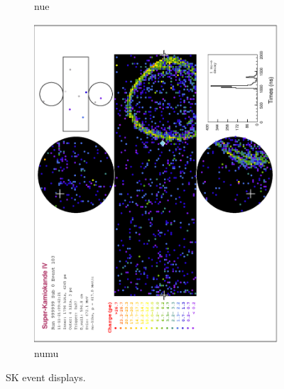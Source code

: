 \begin{figure}
\begin{subfigure}[b]{\dbfigwid\textwidth}
             \caption{nue}
             \label{subfig:sk-nue}
        \end{subfigure}
        \begin{subfigure}[b]{\dbfigwid\textwidth}
             \centering
             \includegraphics[width=\textwidth]{figures/t2k/sk-numu.eps}
             \caption{numu}
             \label{subfig:sk-numu}
        \end{subfigure}
        \caption{SK event displays.}
        \label{fig:sk-e-mu}
  \end{figure}

